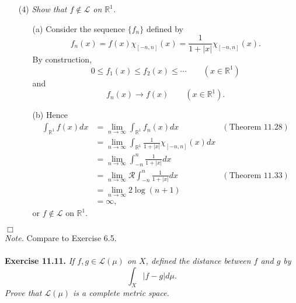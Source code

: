 \documentclass{article}
\begin{document}
\begin{enumerate}
\item[(4)]
  \emph{Show that $f \not\in \mathscr{L}$ on $\mathbb{R}^1$.}
  \begin{enumerate}
  \item[(a)]
  Consider the sequence $\{f_n\}$ defined by
  \[
    f_n(x) = f(x) \chi_{[-n,n]}(x) = \frac{1}{1+|x|} \chi_{[-n,n]}(x).
  \]
  By construction,
  \[
    0 \leq f_1(x) \leq f_2(x) \leq \cdots
    \qquad
    (x \in \mathbb{R}^1)
  \]
  and
  \[
    f_n(x) \to f(x)
    \qquad
    (x \in \mathbb{R}^1).
  \]

  \item[(b)]
  Hence
  \begin{align*}
    \int_{\mathbb{R}^1} f(x) dx
    &= \lim_{n \to \infty} \int_{\mathbb{R}^1} f_n(x) dx
      &(\text{Theorem 11.28}) \\
    &= \lim_{n \to \infty} \int_{\mathbb{R}^1} \frac{1}{1+|x|} \chi_{[-n,n]}(x) dx \\
    &= \lim_{n \to \infty} \int_{-n}^{n} \frac{1}{1+|x|} dx \\
    &= \lim_{n \to \infty} \mathscr{R}\int_{-n}^{n} \frac{1}{1+|x|} dx
      &(\text{Theorem 11.33}) \\
    &= \lim_{n \to \infty} 2 \log(n+1) \\
    &= \infty,
  \end{align*}
  or $f \not\in \mathscr{L}$ on $\mathbb{R}^1$.
  \end{enumerate}
\end{enumerate}
$\Box$ \\



\emph{Note.}
Compare to Exercise 6.5. \\\\






\textbf{Exercise 11.11.}
\emph{If $f, g \in \mathscr{L}(\mu)$ on $X$, defined the distance between $f$ and $g$ by
\[
  \int_{X} |f-g| d\mu.
\]
Prove that $\mathscr{L}(\mu)$ is a complete metric space.} \\
\end{document}
